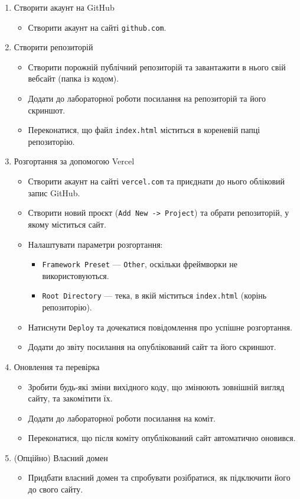 \documentclass[12pt, a4paper]{article}
\begin{document}
\begin{enumerate}
	\item Створити акаунт на GitHub
		\begin{itemize}
			\item Створити акаунт на сайті \verb|github.com|.
		\end{itemize}
	\item Створити репозиторій
		\begin{itemize}
			\item Створити порожній публічний репозиторій та завантажити в нього свій вебсайт (папка із кодом).
			\item Додати до лабораторної роботи посилання на репозиторій та його скриншот.
			\item Переконатися, що файл \verb|index.html| міститься в кореневій папці репозиторію.
		\end{itemize}
	\item Розгортання за допомогою Vercel
		\begin{itemize}
			\item Створити акаунт на сайті \verb|vercel.com| та приєднати до нього обліковий запис GitHub.
			\item Створити новий проєкт (\verb|Add New -> Project|) та обрати репозиторій, у якому міститься сайт.
			\item Налаштувати параметри розгортання:
				\begin{itemize}
					\item \verb|Framework Preset| --- \verb|Other|, оскільки фреймворки не використовуються.
					\item \verb|Root Directory| --- тека, в якій міститься \verb|index.html| (корінь репозиторію).
				\end{itemize}
			\item Натиснути \verb|Deploy| та дочекатися повідомлення про успішне розгортання.
			\item Додати до звіту посилання на опублікований сайт та його скриншот.
		\end{itemize}
	\item Оновлення та перевірка
		\begin{itemize}
			\item Зробити будь-які зміни вихідного коду, що змінюють зовнішній вигляд сайту, та закомітити їх.
			\item Додати до лабораторної роботи посилання на коміт.
			\item Переконатися, що після коміту опублікований сайт автоматично оновився.
		\end{itemize}
	\item (Опційно) Власний домен
		\begin{itemize}
			\item Придбати власний домен та спробувати розібратися, як підключити його до свого сайту.
		\end{itemize}
\end{enumerate}
\end{document}
